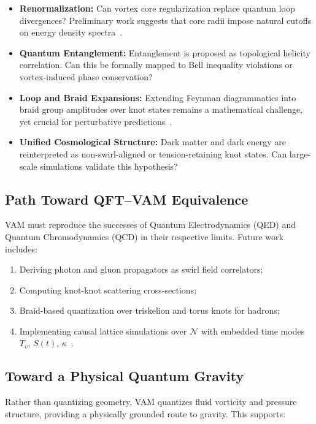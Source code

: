 \documentclass[12pt]{article}
\begin{document}
    \begin{itemize}
        \item \textbf{Renormalization:} Can vortex core regularization replace quantum loop divergences? Preliminary work suggests that core radii impose natural cutoffs on energy density spectra~\cite{kleckner2013knots, moffatt1969knottedness}.
        \item \textbf{Quantum Entanglement:} Entanglement is proposed as topological helicity correlation. Can this be formally mapped to Bell inequality violations or vortex-induced phase conservation?
        \item \textbf{Loop and Braid Expansions:} Extending Feynman diagrammatics into braid group amplitudes over knot states remains a mathematical challenge, yet crucial for perturbative predictions~\cite{kleckner2013knots}.
        \item \textbf{Unified Cosmological Structure:} Dark matter and dark energy are reinterpreted as non-swirl-aligned or tension-retaining knot states. Can large-scale simulations validate this hypothesis?~\cite{verlinde2011origin}
    \end{itemize}

    \subsection*{Path Toward QFT–VAM Equivalence}
    VAM must reproduce the successes of Quantum Electrodynamics (QED) and Quantum Chromodynamics (QCD) in their respective limits. Future work includes:

    \begin{enumerate}
        \item Deriving photon and gluon propagators as swirl field correlators;
        \item Computing knot-knot scattering cross-sections;
        \item Braid-based quantization over triskelion and torus knots for hadrons;
        \item Implementing causal lattice simulations over $\mathcal{N}$ with embedded time modes $T_v$, $S(t)$, $\kappa$~\cite{moffatt1969knottedness}.
    \end{enumerate}

    \subsection*{Toward a Physical Quantum Gravity}
    Rather than quantizing geometry, VAM quantizes fluid vorticity and pressure structure, providing a physically grounded route to gravity. This supports:
\end{document}
